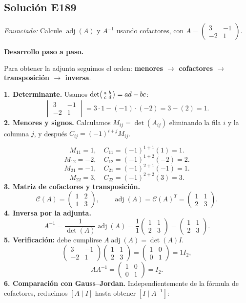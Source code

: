 \documentclass[12pt]{article}
\theoremstyle{remark}
\newcommand{\adj}{\operatorname{adj}}
\newcommand{\solucion}[2]{\Needspace{11\baselineskip}\subsection*{Solución E#1}\noindent\textit{Enunciado:} #2\par\medskip\noindent\textbf{Desarrollo paso a paso.}\par\medskip}
\begin{document}
\medskip

\solucion{189}{Calcule $\adj(A)$ y $A^{-1}$ usando cofactores, con $A=\begin{pmatrix}3&-1\\-2&1\end{pmatrix}$.}
Para obtener la adjunta seguimos el orden: \textbf{menores $\to$ cofactores $\to$ transposición $\to$ inversa}.

\textbf{1. Determinante.}
Usamos $\det\begin{psmallmatrix}a&b\\c&d\end{psmallmatrix}=ad-bc$:
\[
\begin{vmatrix}3&-1\\-2&1\end{vmatrix}=3\cdot 1-(-1)\cdot (-2)=3-(2)=1.
\]
\textbf{2. Menores y signos.} Calculamos $M_{ij}=\det(A_{ij})$ eliminando la fila $i$ y la columna $j$, y después $C_{ij}=(-1)^{i+j}M_{ij}$.

\[
M_{11}=1,\quad C_{11}=(-1)^{1+1}(1)=1.
\]
\[
M_{12}=-2,\quad C_{12}=(-1)^{1+2}(-2)=2.
\]
\[
M_{21}=-1,\quad C_{21}=(-1)^{2+1}(-1)=1.
\]
\[
M_{22}=3,\quad C_{22}=(-1)^{2+2}(3)=3.
\]
\textbf{3. Matriz de cofactores y transposición.}
\[
\mathcal{C}(A)=\begin{pmatrix}1&2\\1&3\end{pmatrix},\qquad\adj(A)=\mathcal{C}(A)^T=\begin{pmatrix}1&1\\2&3\end{pmatrix}.
\]
\textbf{4. Inversa por la adjunta.}
\[
A^{-1}=\frac1{\det(A)}\adj(A)=\frac1{1}\begin{pmatrix}1&1\\2&3\end{pmatrix}=\begin{pmatrix}1&1\\2&3\end{pmatrix}.
\]
\textbf{5. Verificación:} debe cumplirse $A\adj(A)=\det(A)I$.
\[
\begin{pmatrix}3&-1\\-2&1\end{pmatrix}\begin{pmatrix}1&1\\2&3\end{pmatrix}=\begin{pmatrix}1&0\\0&1\end{pmatrix}=1I_{2},
\]
\[
AA^{-1}=\begin{pmatrix}1&0\\0&1\end{pmatrix}=I_{2}.
\]
\textbf{6. Comparación con Gauss--Jordan.} Independientemente de la fórmula de cofactores, reducimos $[A\mid I]$ hasta obtener $[I\mid A^{-1}]$:
\end{document}
